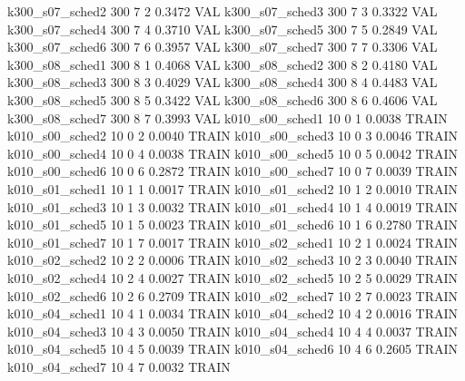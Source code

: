   k300_s07_sched2                  300    7   2    0.3472  VAL
  k300_s07_sched3                  300    7   3    0.3322  VAL
  k300_s07_sched4                  300    7   4    0.3710  VAL
  k300_s07_sched5                  300    7   5    0.2849  VAL
  k300_s07_sched6                  300    7   6    0.3957  VAL
  k300_s07_sched7                  300    7   7    0.3306  VAL
  k300_s08_sched1                  300    8   1    0.4068  VAL
  k300_s08_sched2                  300    8   2    0.4180  VAL
  k300_s08_sched3                  300    8   3    0.4029  VAL
  k300_s08_sched4                  300    8   4    0.4483  VAL
  k300_s08_sched5                  300    8   5    0.3422  VAL
  k300_s08_sched6                  300    8   6    0.4606  VAL
  k300_s08_sched7                  300    8   7    0.3993  VAL
  k010_s00_sched1                   10    0   1    0.0038  TRAIN
  k010_s00_sched2                   10    0   2    0.0040  TRAIN
  k010_s00_sched3                   10    0   3    0.0046  TRAIN
  k010_s00_sched4                   10    0   4    0.0038  TRAIN
  k010_s00_sched5                   10    0   5    0.0042  TRAIN
  k010_s00_sched6                   10    0   6    0.2872  TRAIN
  k010_s00_sched7                   10    0   7    0.0039  TRAIN
  k010_s01_sched1                   10    1   1    0.0017  TRAIN
  k010_s01_sched2                   10    1   2    0.0010  TRAIN
  k010_s01_sched3                   10    1   3    0.0032  TRAIN
  k010_s01_sched4                   10    1   4    0.0019  TRAIN
  k010_s01_sched5                   10    1   5    0.0023  TRAIN
  k010_s01_sched6                   10    1   6    0.2780  TRAIN
  k010_s01_sched7                   10    1   7    0.0017  TRAIN
  k010_s02_sched1                   10    2   1    0.0024  TRAIN
  k010_s02_sched2                   10    2   2    0.0006  TRAIN
  k010_s02_sched3                   10    2   3    0.0040  TRAIN
  k010_s02_sched4                   10    2   4    0.0027  TRAIN
  k010_s02_sched5                   10    2   5    0.0029  TRAIN
  k010_s02_sched6                   10    2   6    0.2709  TRAIN
  k010_s02_sched7                   10    2   7    0.0023  TRAIN
  k010_s04_sched1                   10    4   1    0.0034  TRAIN
  k010_s04_sched2                   10    4   2    0.0016  TRAIN
  k010_s04_sched3                   10    4   3    0.0050  TRAIN
  k010_s04_sched4                   10    4   4    0.0037  TRAIN
  k010_s04_sched5                   10    4   5    0.0039  TRAIN
  k010_s04_sched6                   10    4   6    0.2605  TRAIN
  k010_s04_sched7                   10    4   7    0.0032  TRAIN
